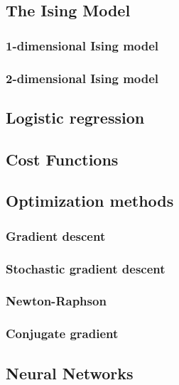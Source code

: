 \subsection{The Ising Model}
\subsubsection{1-dimensional Ising model}
\subsubsection{2-dimensional Ising model}

\subsection{Logistic regression}

\subsection{Cost Functions}

\subsection{Optimization methods}
\subsubsection{Gradient descent}
\subsubsection{Stochastic gradient descent}
\subsubsection{Newton-Raphson}
\subsubsection{Conjugate gradient}


\subsection{Neural Networks}
